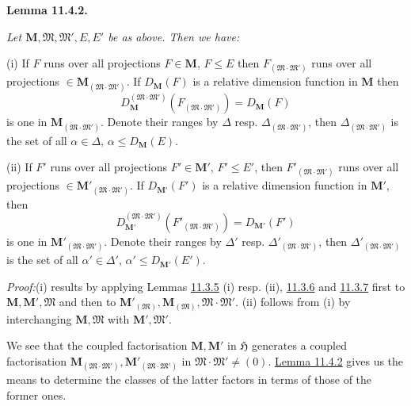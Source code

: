 \documentclass[12pt,b5paper,twoside]{article}
\newcommand{\Hspace}{\mathfrak H}
\newcommand{\M}{\mathbf M}
\newcommand{\Lemma}[1]{%
  \par\smallskip\noindent\phantomsection\label{lem:#1}\textbf{Lemma #1.}\enspace
}
\newcommand{\Proof}{\par\noindent\textit{Proof:}\enspace}
\newcommand{\lemref}[1]{\hyperref[lem:#1]{Lemma #1}}
\begin{document}
\Lemma{11.4.2}
{\itshape
Let $\M,\mathfrak M,\mathfrak M',E,E'$ be as above. Then we have:

(i) If $F$ runs over all projections $F\in\M$, $F\leq E$ then
$F_{(\mathfrak M\cdot\mathfrak M')}$ runs over all projections
$\in\M_{(\mathfrak M\cdot\mathfrak M')}$. If $D_{\M}(F)$ is a relative
dimension function in $\M$ then
\[
 D_{\M}^{(\mathfrak M\cdot\mathfrak M')}
 (F_{(\mathfrak M\cdot\mathfrak M')})=D_{\M}(F)
\]
is one in $\M_{(\mathfrak M\cdot\mathfrak M')}$. Denote their ranges by
 $\Delta$ resp. $\Delta_{(\mathfrak M\cdot\mathfrak M')}$, then
$\Delta_{(\mathfrak M\cdot\mathfrak M')}$ is the set of all
$\alpha\in\Delta$, $\alpha\leq D_{\M}(E)$.

(ii) If $F'$ runs over all projections $F'\in\M'$, $F'\leq E'$, then
$F'_{(\mathfrak M\cdot\mathfrak M')}$ runs over all projections
$\in\M'_{(\mathfrak M\cdot\mathfrak M')}$. If $D_{\M'}(F')$ is a
relative dimension function in $\M'$, then
\[
 D_{\M'}^{(\mathfrak M\cdot\mathfrak M')}
 (F'_{(\mathfrak M\cdot\mathfrak M')})=D_{\M'}(F')
\]
is one in $\M'_{(\mathfrak M\cdot\mathfrak M')}$. Denote their ranges by
 $\Delta'$ resp. $\Delta'_{(\mathfrak M\cdot\mathfrak M')}$, then
$\Delta'_{(\mathfrak M\cdot\mathfrak M')}$ is the set of all
$\alpha'\in\Delta'$, $\alpha'\leq D_{\M'}(E')$.}

\Proof (i) results by applying Lemmas \hyperref[lem:11.3.5]{11.3.5} (i)
 resp. (ii), \hyperref[lem:11.3.6]{11.3.6} and
\hyperref[lem:11.3.7]{11.3.7} first to
$\M,\M',\mathfrak M$ and then to
$\M'_{(\mathfrak M)},\M_{(\mathfrak M)},
\mathfrak M\cdot\mathfrak M'$. (ii) follows from (i) by interchanging
$\M,\mathfrak M$ with $\M',\mathfrak M'$.

We see that the coupled factorisation $\M,\M'$ in $\Hspace$ generates a
coupled factorisation
$\M_{(\mathfrak M\cdot\mathfrak M')},
\M'_{(\mathfrak M\cdot\mathfrak M')}$ in
$\mathfrak M\cdot\mathfrak M'\ne(0)$. \lemref{11.4.2} gives us the
means to determine the classes of the latter factors in terms of those of
the former ones.
\end{document}
